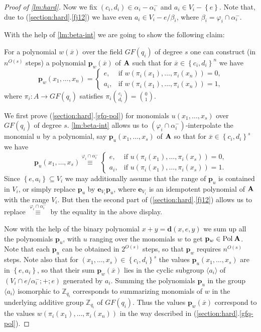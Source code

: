 \documentclass[11pt,a4paper]{amsart}
\newcounter{senumi}[section]
\newcounter{senumip}[section]
\newcounter{temp}[section]
\def\thesenumi{\thesection.\arabic{senumip}}
\newenvironment{senumerate}{\begin{list}{\hspace{-2em}(\thesenumi)}{\usecounter{senumip}}
\setcounter{senumip}{\value{temp}}
    }{\setcounter{temp}{\value{senumip}}
     \end{list}}
\newcommand{\m}[1]{{\uppercase {\bf{#1}}}}
\newcommand{\set}[1]{{\left\{ {#1} \right\} }}
\newcommand{\ci}{\subseteq}
\newcommand{\vpair}[2]{{{#1}\choose{#2}}}
\newcommand{\pol}[1]{{\rm Pol\:\m #1}}
\newcommand{\po}[1]{{\mathbf {#1}}}
\newcounter{claim}
\renewcommand{\o}[1]{\overline {#1}}
\newcommand{\map}{\longrightarrow}
\newcommand{\congruent}[1]{\stackrel{#1}{\equiv}}
\newcommand{\fj}{\varphi}
\newcommand{\setm}{-}
\newcommand{\ee}{e}
\newcommand{\aai}{a_i}
\newcommand{\cci}{c_i}
\newcommand{\ddi}{d_i}
\newcommand{\alphai}{\alpha_i}
\newcommand{\betai}{\beta_i}
\newcommand{\alphami}{\alpha^-_i}
\newcommand{\vi}{V_i}
\newcommand{\fji}{\fj_i}
\newcommand{\z}{\mathbb{Z}}
\begin{document}
\begin{proof}[Proof of \cref{lm:hard}]
Now we fix $(\cci,\ddi)\in \alphai-\alphami$ and $\aai\in \vi\setm\set{\ee}$.
Note that, due to (\ref{section:hard}.\ref{fj12}) we have even $\aai\in \vi\setm\ee/\betai$,
where $\beta_i=\fji\cap\alphami$.

With the help of \cref{lm:beta-int} we are going to show the following claim:
\begin{senumerate}
\item
\label{gfq-pol}
For a polynomial $w(\o x)$ over the field $GF(q_i)$ of degree $s$
one can construct (in $n^{O(s)}$ steps) a polynomial $\po p_w(\o x)$ of $\m A$
such that for $\o x\in\set{\cci,\ddi}^n$ we have
\begin{equation*}
\po p_w(x_1,\ldots,x_n)=
\left\{
\begin{array}{ll}
\ee,   &\mbox{if $w(\pi_i(x_1),\ldots,\pi_i(x_n))=0$,}\\
\aai,  &\mbox{if $w(\pi_i(x_1),\ldots,\pi_i(x_n))=1$,}
\end{array}
\right.
\end{equation*}
where $\pi_i: A\map GF(q_i)$ satisfies $\pi_i\vpair{\cci}{\ddi} = \vpair{0}{1}$.
\end{senumerate}
We first prove (\ref{section:hard}.\ref{gfq-pol})
for monomials $u(x_1,\ldots,x_s)$ over $GF(q_i)$ of degree $s$.
\cref{lm:beta-int} allows us to $(\fji\cap\alphami)$-interpolate the monomial $u$ by a polynomial,
say $\po p_u(x_1,\ldots,x_s)$ of $\m A$ so that for $\o x\in\set{\cci,\ddi}^s$ we have
\begin{equation*}
\po p_u(x_1,\ldots,x_s) \congruent{\fji\cap\alphami}
\left\{
\begin{array}{ll}
\ee,   &\mbox{if $u(\pi_i(x_1),\ldots,\pi_i(x_s))=0$,}\\
\aai,  &\mbox{if $u(\pi_i(x_1),\ldots,\pi_i(x_s))=1$.}
\end{array}
\right.
\end{equation*}
Since $\set{\ee,\aai}\ci\vi$ we may additionally assume
that the range of $\po p_u$ is contained in $\vi$,
or simply replace $\po p_u$ by $\po e_{\vi}\po p_u$,
where $\po e_{\vi}$ is an idempotent polynomial of $\m A$ with the range $\vi$.
But then the second part of (\ref{section:hard}.\ref{fj12}) allows us to replace
$\congruent{\fji\cap\alphami}$ by the equality in the above display.

Now with the help of the binary polynomial $x+y=\po d(x,e,y)$ we sum up all the polynomials
$\po p_u$, with $u$ ranging over the monomials  $w$ to get $\po p_w\in \pol{A}$.
Note that each $\po p_u$ can be obtained in $2^{O(s)}$ steps, so that $\po p_w$ requires
$n^{O(s)}$ steps.
Note also that for $(x_1,\ldots,x_s)\in\set{\cci,\ddi}^s$
the values $\po p_u(x_1,\ldots,x_s)$ are in $\set{\ee,\aai}$,
so that their sum $\po p_w(\o x)$ lies in the cyclic subgroup
$\langle \aai \rangle$ of $(\vi\cap \ee/\alphami; + ; \ee)$ generated by $\aai$.
Summing the polynomials $\po p_u$ in the group $\langle \aai \rangle$ isomorphic to $\z_{q_i}$
corresponds to summarizing monomials of $w$ in the underlying additive group $\z_{q_i}$ of $GF(q_i)$.
Thus the values $\po p_w(\o x)$ correspond to the values $w(\pi_i(x_1),\ldots,\pi_i(x_n))$
in the way described in (\ref{section:hard}.\ref{gfq-pol}).


\end{proof}
\end{document}
